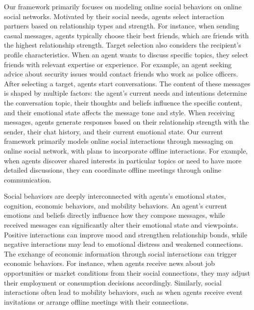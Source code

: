 Our framework primarily focuses on modeling online social behaviors on online social networks. Motivated by their social needs, agents select interaction partners based on relationship types and strength. For instance, when sending casual messages, agents typically choose their best friends, which are friends with the highest relationship strength. Target selection also considers the recipient's profile characteristics. When an agent wants to discuss specific topics, they select friends with relevant expertise or experience. For example, an agent seeking advice about security issues would contact friends who work as police officers. After selecting a target, agents start conversations. The content of these messages is shaped by multiple factors: the agent's current needs and intentions determine the conversation topic, their thoughts and beliefs influence the specific content, and their emotional state affects the message tone and style. When receiving messages, agents generate responses based on their relationship strength with the sender, their chat history, and their current emotional state. Our current framework primarily models online social interactions through messaging on online social network, with plans to incorporate offline interactions. For example, when agents discover shared interests in particular topics or need to have more detailed discussions, they can coordinate offline meetings through online communication.

Social behaviors are deeply interconnected with agents's emotional states, cognition, economic behaviors, and mobility behaviors. An agent's current emotions and beliefs directly influence how they compose messages, while received messages can significantly alter their emotional state and viewpoints. Positive interactions can improve mood and strengthen relationship bonds, while negative interactions may lead to emotional distress and weakened connections. The exchange of economic information through social interactions can trigger economic behaviors. For instance, when agents receive news about job opportunities or market conditions from their social connections, they may adjust their employment or consumption decisions accordingly. Similarly, social interactions often lead to mobility behaviors, such as when agents receive event invitations or arrange offline meetings with their connections.


